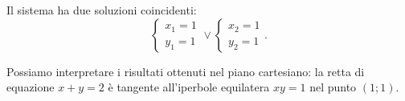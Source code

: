 \begin{exrig}
\begin{esempio}
\begin{multicols}{2}
Il sistema ha due soluzioni coincidenti: \[ 
\left\{\begin{array}{l}{x_1=1}\\{y_1=1}\end{array}\right.\vee 
\left\{\begin{array}{l}{x_2=1}\\{y_2=1}\end{array}\right.. \]

Possiamo interpretare i risultati ottenuti nel piano cartesiano: la retta di 
equazione $x+y=2$ è tangente all'iperbole equilatera $xy=1$ nel punto $(1;1)$.
\begin{center}

\end{center}
\end{multicols}
\end{esempio}
\end{exrig}

